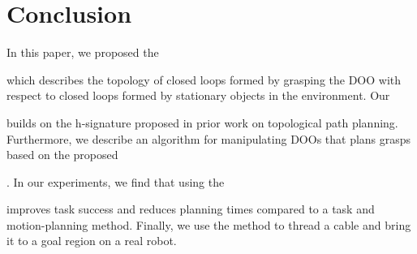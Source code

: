 \section{Conclusion}

In this paper, we proposed the \signature{} which describes the topology of closed loops formed by grasping the DOO with respect to closed loops formed by stationary objects in the environment. Our \signature{} builds on the h-signature proposed in prior work on topological path planning. Furthermore, we describe an algorithm for manipulating DOOs that plans grasps based on the proposed \signature{}. In our experiments, we find that using the \signature{} improves task success and reduces planning times compared to a task and motion-planning method. Finally, we use the method to thread a cable and bring it to a goal region on a real robot.